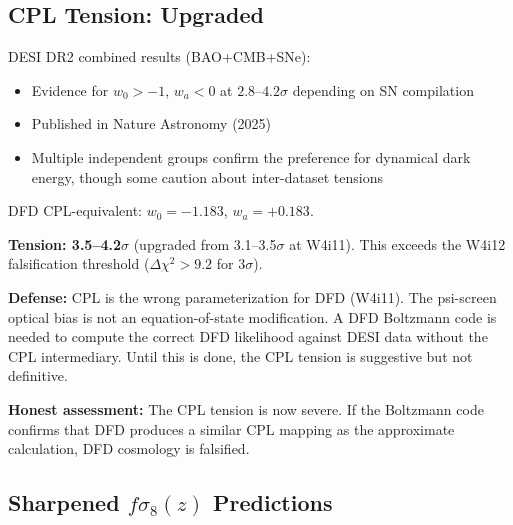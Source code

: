 \documentclass[11pt,a4paper]{article}
\begin{document}
\subsection{CPL Tension: Upgraded}

\begin{tensionbox}

DESI DR2 combined results (BAO+CMB+SNe):
\begin{itemize}[nosep]
\item Evidence for $w_0 > -1$, $w_a < 0$ at $2.8$--$4.2\sigma$
  depending on SN compilation
\item Published in Nature Astronomy (2025)
\item Multiple independent groups confirm the preference for dynamical
  dark energy, though some caution about inter-dataset tensions
\end{itemize}

DFD CPL-equivalent: $w_0 = -1.183$, $w_a = +0.183$.

\textbf{Tension: 3.5--4.2$\sigma$} (upgraded from 3.1--3.5$\sigma$
at W4i11). This exceeds the W4i12 falsification threshold
($\Delta\chi^2 > 9.2$ for $3\sigma$).

\textbf{Defense:} CPL is the wrong parameterization for DFD (W4i11).
The psi-screen optical bias is not an equation-of-state modification.
A DFD Boltzmann code is needed to compute the correct DFD likelihood
against DESI data without the CPL intermediary. Until this is done,
the CPL tension is suggestive but not definitive.

\textbf{Honest assessment:} The CPL tension is now severe. If the
Boltzmann code confirms that DFD produces a similar CPL mapping as
the approximate calculation, DFD cosmology is falsified.
\end{tensionbox}

\subsection{Sharpened $f\sigma_8(z)$ Predictions}
\end{document}
